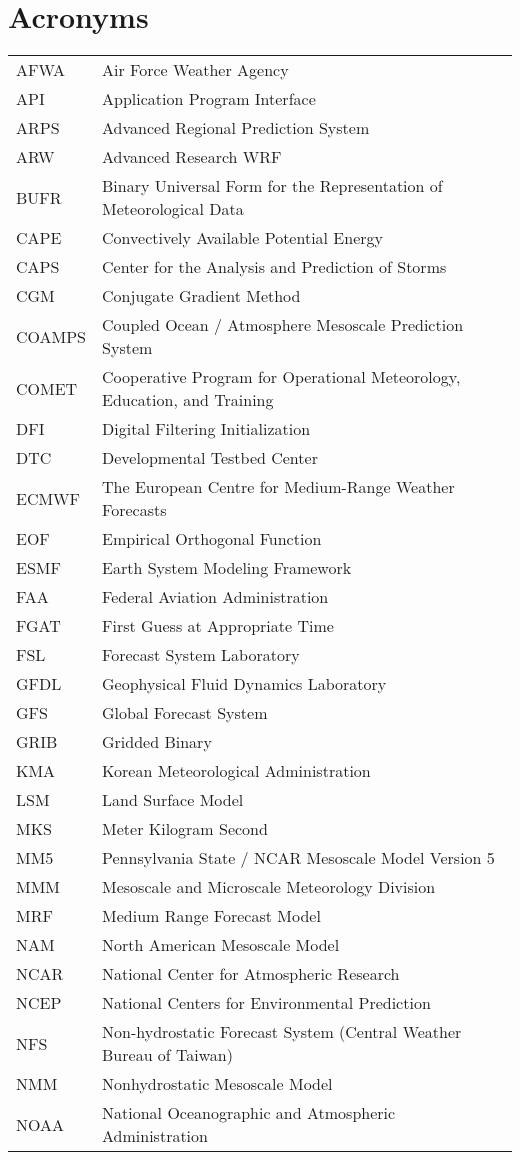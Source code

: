 \chapter{Acronyms}

\begin{tabular}[t]{ll}
AFWA & Air Force Weather Agency \\
API & Application Program Interface \\
ARPS & Advanced Regional Prediction System \\
ARW & Advanced Research WRF \\
BUFR & Binary Universal Form for the Representation of Meteorological Data \\
CAPE & Convectively Available Potential Energy \\
CAPS & Center for the Analysis and Prediction of Storms \\
CGM & Conjugate Gradient Method \\
COAMPS & Coupled Ocean / Atmosphere Mesoscale Prediction System \\
COMET & Cooperative Program for Operational Meteorology, Education, and Training \\
DFI & Digital Filtering Initialization \\
DTC & Developmental Testbed Center \\
ECMWF & The European Centre for Medium-Range Weather Forecasts \\
EOF & Empirical Orthogonal Function \\
ESMF & Earth System Modeling Framework \\
FAA & Federal Aviation Administration \\
FGAT & First Guess at Appropriate Time \\
FSL & Forecast System Laboratory \\
GFDL & Geophysical Fluid Dynamics Laboratory \\
GFS & Global Forecast System \\
GRIB & Gridded Binary \\
KMA & Korean Meteorological Administration \\
LSM & Land Surface Model \\
MKS & Meter Kilogram Second \\
MM5 & Pennsylvania State / NCAR Mesoscale Model Version 5 \\
MMM & Mesoscale and Microscale Meteorology Division \\
MRF & Medium Range Forecast Model \\
NAM & North American Mesoscale Model \\
NCAR & National Center for Atmospheric Research \\
NCEP & National Centers for Environmental Prediction \\
NFS & Non-hydrostatic Forecast System (Central Weather Bureau of Taiwan) \\
NMM & Nonhydrostatic Mesoscale Model \\
NOAA & National Oceanographic and Atmospheric Administration \\
\end{tabular}
